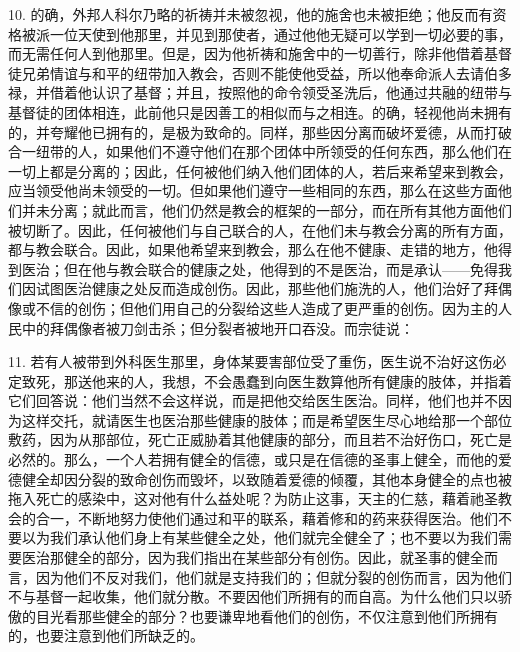 10. 的确，外邦人科尔乃略的祈祷并未被忽视，他的施舍也未被拒绝；他反而有资格被派一位天使到他那里，并见到那使者，通过他他无疑可以学到一切必要的事，而无需任何人到他那里。但是，因为他祈祷和施舍中的一切善行，除非他借着基督徒兄弟情谊与和平的纽带加入教会，否则不能使他受益，所以他奉命派人去请伯多禄，并借着他认识了基督；并且，按照他的命令领受圣洗后，他通过共融的纽带与基督徒的团体相连，此前他只是因善工的相似而与之相连。的确，轻视他尚未拥有的，并夸耀他已拥有的，是极为致命的。同样，那些因分离而破坏爱德，从而打破合一纽带的人，如果他们不遵守他们在那个团体中所领受的任何东西，那么他们在一切上都是分离的；因此，任何被他们纳入他们团体的人，若后来希望来到教会，应当领受他尚未领受的一切。但如果他们遵守一些相同的东西，那么在这些方面他们并未分离；就此而言，他们仍然是教会的框架的一部分，而在所有其他方面他们被切断了。因此，任何被他们与自己联合的人，在他们未与教会分离的所有方面，都与教会联合。因此，如果他希望来到教会，那么在他不健康、走错的地方，他得到医治；但在他与教会联合的健康之处，他得到的不是医治，而是承认——免得我们因试图医治健康之处反而造成创伤。因此，那些他们施洗的人，他们治好了拜偶像或不信的创伤；但他们用自己的分裂给这些人造成了更严重的创伤。因为主的人民中的拜偶像者被刀剑击杀；但分裂者被地开口吞没。而宗徒说：\par

11. 若有人被带到外科医生那里，身体某要害部位受了重伤，医生说不治好这伤必定致死，那送他来的人，我想，不会愚蠢到向医生数算他所有健康的肢体，并指着它们回答说：他们当然不会这样说，而是把他交给医生医治。同样，他们也并不因为这样交托，就请医生也医治那些健康的肢体；而是希望医生尽心地给那一个部位敷药，因为从那部位，死亡正威胁着其他健康的部分，而且若不治好伤口，死亡是必然的。那么，一个人若拥有健全的信德，或只是在信德的圣事上健全，而他的爱德健全却因分裂的致命创伤而毁坏，以致随着爱德的倾覆，其他本身健全的点也被拖入死亡的感染中，这对他有什么益处呢？为防止这事，天主的仁慈，藉着祂圣教会的合一，不断地努力使他们通过和平的联系，藉着修和的药来获得医治。他们不要以为我们承认他们身上有某些健全之处，他们就完全健全了；也不要以为我们需要医治那健全的部分，因为我们指出在某些部分有创伤。因此，就圣事的健全而言，因为他们不反对我们，他们就是支持我们的；但就分裂的创伤而言，因为他们不与基督一起收集，他们就分散。不要因他们所拥有的而自高。为什么他们只以骄傲的目光看那些健全的部分？也要谦卑地看他们的创伤，不仅注意到他们所拥有的，也要注意到他们所缺乏的。\par

